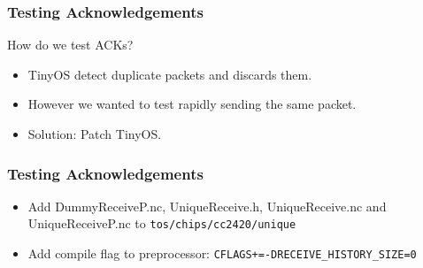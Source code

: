 
\begin{frame}
\frametitle{Testing Acknowledgements}
How do we test ACKs?

\begin{itemize}
\item TinyOS detect duplicate packets and discards them. 
\item However we wanted to test rapidly sending the same packet.
\item Solution: Patch TinyOS.
\end{itemize}

\end{frame}

\begin{frame}
\frametitle{Testing Acknowledgements}
\begin{itemize}
\item Add DummyReceiveP.nc, UniqueReceive.h, UniqueReceive.nc and
UniqueReceiveP.nc to \texttt{tos/chips/cc2420/unique}
\item Add compile flag to preprocessor: \texttt{CFLAGS+=-DRECEIVE\_HISTORY\_SIZE=0}
\end{itemize}
\end{frame}

